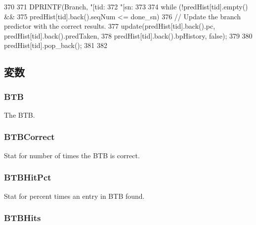 \begin{DoxyCode}
370 {
371     DPRINTF(Branch, "[tid:%
372             "[sn:%
373 
374     while (!predHist[tid].empty() &&
375            predHist[tid].back().seqNum <= done_sn) {
376         // Update the branch predictor with the correct results.
377         update(predHist[tid].back().pc, predHist[tid].back().predTaken,
378                predHist[tid].back().bpHistory, false);
379 
380         predHist[tid].pop_back();
381     }
382 }
\end{DoxyCode}


\subsection{変数}
\hypertarget{classBPredUnit_abd4f25a0378890fc9bfa1adef49cc0ce}{
\subsubsection[{BTB}]{ {\bf BTB}}}
\label{classBPredUnit_abd4f25a0378890fc9bfa1adef49cc0ce}
The BTB. \hypertarget{classBPredUnit_a05ffad6906b6204237963e1d3652be90}{
\subsubsection[{BTBCorrect}]{ {\bf BTBCorrect}}}
\label{classBPredUnit_a05ffad6906b6204237963e1d3652be90}
Stat for number of times the BTB is correct. \hypertarget{classBPredUnit_adeb28302a86d176687ddfc4227ef78ff}{
\subsubsection[{BTBHitPct}]{ {\bf BTBHitPct}}}
\label{classBPredUnit_adeb28302a86d176687ddfc4227ef78ff}
Stat for percent times an entry in BTB found. \hypertarget{classBPredUnit_a62943c2b7168001cfb6cf5f3a724e04a}{
\subsubsection[{BTBHits}]{ {\bf BTBHits}}}

